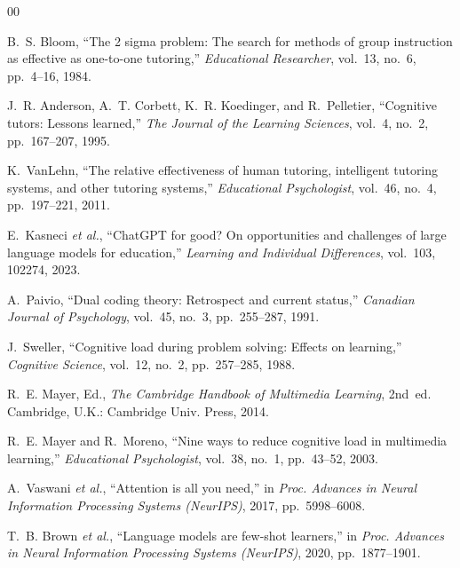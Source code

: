 \clearpage
{}
\renewcommand{\bibname}{References}

\begin{thebibliography}{00}
\addtolength{\itemsep}{-2pt}

 B.~S. Bloom, ``The 2 sigma problem: The search for methods
of group instruction as effective as one-to-one tutoring,'' \emph{Educational
Researcher}, vol.~13, no.~6, pp.~4--16, 1984.

 J.~R. Anderson, A.~T. Corbett, K.~R. Koedinger,
and R.~Pelletier, ``Cognitive tutors: Lessons learned,'' \emph{The Journal of
the Learning Sciences}, vol.~4, no.~2, pp.~167--207, 1995.

 K.~VanLehn, ``The relative effectiveness of human
tutoring, intelligent tutoring systems, and other tutoring systems,''
\emph{Educational Psychologist}, vol.~46, no.~4, pp.~197--221, 2011.

 E.~Kasneci \emph{et al.}, ``ChatGPT for good? On
opportunities and challenges of large language models for education,''
\emph{Learning and Individual Differences}, vol.~103, 102274, 2023.

 A.~Paivio, ``Dual coding theory: Retrospect and current
status,'' \emph{Canadian Journal of Psychology}, vol.~45, no.~3, pp.~255--287,
1991.

 J.~Sweller, ``Cognitive load during problem solving:
Effects on learning,'' \emph{Cognitive Science}, vol.~12, no.~2, pp.~257--285,
1988.

 R.~E. Mayer, Ed., \emph{The Cambridge Handbook of
Multimedia Learning}, 2nd~ed. Cambridge, U.K.: Cambridge Univ. Press, 2014.

 R.~E. Mayer and R.~Moreno, ``Nine ways to reduce
cognitive load in multimedia learning,'' \emph{Educational Psychologist},
vol.~38, no.~1, pp.~43--52, 2003.

 A.~Vaswani \emph{et al.}, ``Attention is all you
need,'' in \emph{Proc. Advances in Neural Information Processing Systems
(NeurIPS)}, 2017, pp.~5998--6008.

 T.~B. Brown \emph{et al.}, ``Language models are
few-shot learners,'' in \emph{Proc. Advances in Neural Information Processing
Systems (NeurIPS)}, 2020, pp.~1877--1901.


\end{thebibliography}
